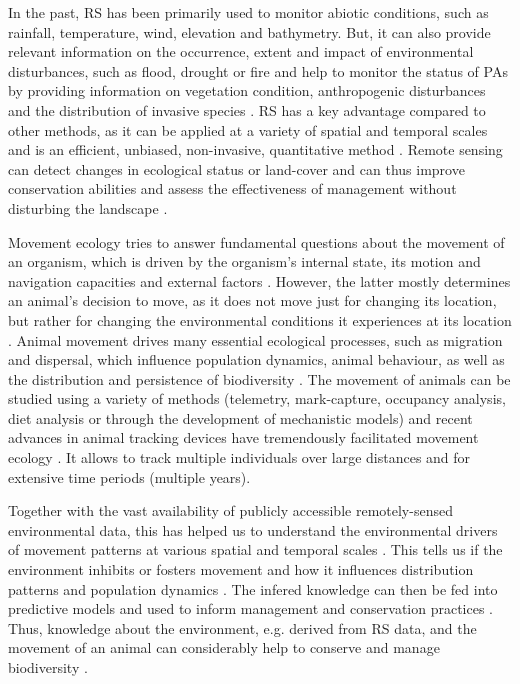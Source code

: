 \documentclass[12pt,a4paper, twoside, english]{article}
\begin{document}
In the past, RS has been primarily used to monitor abiotic conditions, such as rainfall, temperature, wind, elevation and bathymetry. But, it can also provide relevant information on the occurrence, extent and impact of environmental disturbances, such as flood, drought or fire and help to monitor the status of PAs by providing information on vegetation condition, anthropogenic disturbances and the distribution of invasive species \citep{Pettorelli2014, Nagendra2013}. RS has a key advantage compared to other methods, as it can be applied at a variety of spatial and temporal scales and is an efficient, unbiased, non-invasive, quantitative method \citep{Willis2015}. Remote sensing can detect changes in ecological status or land-cover and can thus improve conservation abilities and assess the effectiveness of management without disturbing the landscape \citep{Pettorelli2014, Willis2015, Wegmann2014}.

Movement ecology tries to answer fundamental questions about the movement of an organism, which is driven by the organism's internal state, its motion and navigation capacities and external factors \citep{Nathan2008}. However, the latter mostly determines an animal's decision to move, as it does not move just for changing its location, but rather for changing the environmental conditions it experiences at its location \citep{VanMoorter2016}. Animal movement drives many essential ecological processes, such as migration and dispersal, which influence population dynamics, animal behaviour, as well as the distribution and persistence of biodiversity \citep{Jeltsch2013, Barton2015, McClintock2014, Bauer2014}. The movement of animals can be studied using a variety of methods (telemetry, mark-capture, occupancy analysis, diet analysis or through the development of mechanistic models) \citep{Driscoll2014} and recent advances in animal tracking devices have tremendously facilitated movement ecology \citep{Cooke2004a, Wilson2008a, Rutz2009, Urbano2010}. It allows to track multiple individuals over large distances and for extensive time periods (multiple years). 

Together with the vast availability of publicly accessible remotely-sensed environmental data, this has helped us to understand the environmental drivers of movement patterns at various spatial and temporal scales \citep{Neumann2015a, Trierweiler2013, Pettorelli2014}. This tells us if the environment inhibits or fosters movement \citep{Fahrig2007, Beyer2016} and how it influences distribution patterns and population dynamics \citep{Trierweiler2013}. The infered knowledge can then be fed into predictive models and used to inform management and conservation practices \citep{Avgar2013}. Thus, knowledge about the environment, e.g. derived from RS data, and the movement of an animal can considerably help to conserve and manage biodiversity \citep{Barton2015, Neumann2015a, DeKnegt2011, Driscoll2014}.
\end{document}
